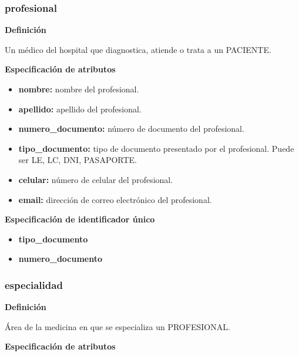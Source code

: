 \documentclass[a4paper,11pt]{article}
\begin{document}
\subsubsection{\textbf{profesional}}

\textbf{Definición}

Un médico del hospital que diagnostica, atiende o trata a un PACIENTE.

\textbf{Especificación de atributos}

\begin{itemize}

     \item \textbf{nombre:} nombre del profesional.

     \item \textbf{apellido:} apellido del profesional.

     \item \textbf{numero\_documento:} número de documento del profesional.

     \item \textbf{tipo\_documento:} tipo de documento presentado por el profesional. Puede ser 
     LE, LC, DNI, PASAPORTE.

     \item \textbf{celular:} número de celular del profesional.

     \item \textbf{email:} dirección de correo electrónico del profesional.

\end{itemize}

\textbf{Especificación de identificador único}

\begin{itemize}

     \item \textbf{tipo\_documento}

     \item \textbf{numero\_documento}

\end{itemize}

\subsubsection{\textbf{especialidad}}

\textbf{Definición}

Área de la medicina en que se especializa un PROFESIONAL.

\textbf{Especificación de atributos}
\end{document}
